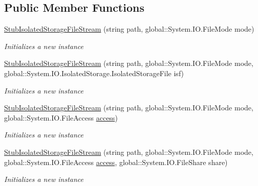 \subsection*{Public Member Functions}
\begin{DoxyCompactItemize}
\item 
\hyperlink{class_system_1_1_i_o_1_1_isolated_storage_1_1_fakes_1_1_stub_isolated_storage_file_stream_a67bb3b6c3c345f8756e1d74f3c81cb14}{Stub\-Isolated\-Storage\-File\-Stream} (string path, global\-::\-System.\-I\-O.\-File\-Mode mode)
\begin{DoxyCompactList}\small\item\em Initializes a new instance\end{DoxyCompactList}\item 
\hyperlink{class_system_1_1_i_o_1_1_isolated_storage_1_1_fakes_1_1_stub_isolated_storage_file_stream_ae71eb7ebce6e7925b027be11c7efc2db}{Stub\-Isolated\-Storage\-File\-Stream} (string path, global\-::\-System.\-I\-O.\-File\-Mode mode, global\-::\-System.\-I\-O.\-Isolated\-Storage.\-Isolated\-Storage\-File isf)
\begin{DoxyCompactList}\small\item\em Initializes a new instance\end{DoxyCompactList}\item 
\hyperlink{class_system_1_1_i_o_1_1_isolated_storage_1_1_fakes_1_1_stub_isolated_storage_file_stream_a682c6ad357b4c3d6c9455b5326c4e3a6}{Stub\-Isolated\-Storage\-File\-Stream} (string path, global\-::\-System.\-I\-O.\-File\-Mode mode, global\-::\-System.\-I\-O.\-File\-Access \hyperlink{jquery-1_810_82-vsdoc_8js_a130ad18d21e14ee566dbf4eb185f2bda}{access})
\begin{DoxyCompactList}\small\item\em Initializes a new instance\end{DoxyCompactList}\item 
\hyperlink{class_system_1_1_i_o_1_1_isolated_storage_1_1_fakes_1_1_stub_isolated_storage_file_stream_ae7cf34a6db752f016534f813eb3969ba}{Stub\-Isolated\-Storage\-File\-Stream} (string path, global\-::\-System.\-I\-O.\-File\-Mode mode, global\-::\-System.\-I\-O.\-File\-Access \hyperlink{jquery-1_810_82-vsdoc_8js_a130ad18d21e14ee566dbf4eb185f2bda}{access}, global\-::\-System.\-I\-O.\-File\-Share share)
\begin{DoxyCompactList}\small\item\em Initializes a new instance\end{DoxyCompactList}\item 

\end{DoxyCompactItemize}
